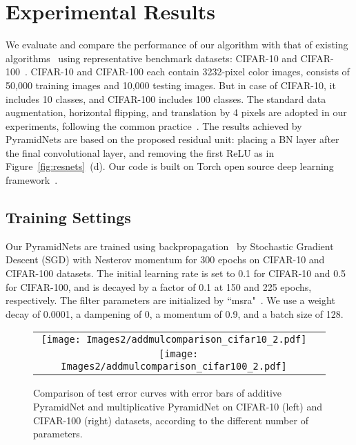 \documentclass[10pt,twocolumn,letterpaper]{article}
\begin{document}
\section{Experimental Results}
\label{section:exp}







We evaluate and compare the performance of our algorithm with that of existing algorithms~\cite{resnet,preresnet,NiN,weightedresnet,wideresnet} using representative benchmark datasets: CIFAR-10 and CIFAR-100~\cite{cifar}. CIFAR-10 and CIFAR-100 each contain 3232-pixel color images, consists of 50,000 training images and 10,000 testing images. But in case of CIFAR-10, it includes 10 classes, and CIFAR-100 includes 100 classes. The standard data augmentation, horizontal flipping, and translation by 4 pixels are adopted in our experiments, following the common practice~\cite{NiN}. The results achieved by PyramidNets are based on the proposed residual unit: placing a BN layer after the final convolutional layer, and removing the first ReLU as in Figure~\ref{fig:resnets}~(d). Our code is built on Torch open source deep learning framework~\cite{torch7}.

\subsection{Training Settings}

Our PyramidNets are trained using backpropagation~\cite{backprop} by Stochastic Gradient Descent (SGD) with Nesterov momentum for 300 epochs on CIFAR-10 and CIFAR-100 datasets. The initial learning rate is set to 0.1 for CIFAR-10 and 0.5 for CIFAR-100, and is decayed by a factor of 0.1 at 150 and 225 epochs, respectively. The filter parameters are initialized by ``msra"~\cite{prelu}. We use a weight decay of 0.0001, a dampening of 0, a momentum of 0.9, and a batch size of 128.
\begin{figure}[t]
\begin{center}
\begin{tabular}{cc}
\texttt{[image: Images2/addmulcomparison\_cifar10\_2.pdf]} \ \quad
\texttt{[image: Images2/addmulcomparison\_cifar100\_2.pdf]}
\end{tabular}
\end{center}
\caption{Comparison of test error curves with error bars of additive PyramidNet and multiplicative PyramidNet on CIFAR-10 (left) and CIFAR-100 (right) datasets, according to the different number of parameters.}
\label{fig:addmulcomparision}
\vspace{-3mm}
\end{figure}
\end{document}

